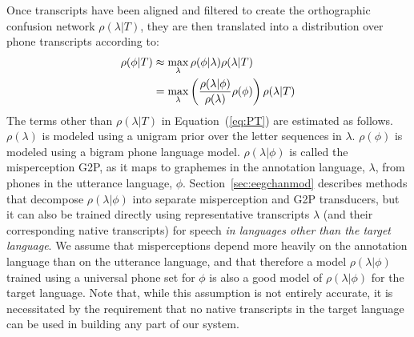 Once transcripts have
been aligned and filtered to create the orthographic confusion network
$\rho(\lambda|T)$, they are then translated into a distribution over
phone transcripts according to:
\begin{align}
  \rho(\phi|T) 
  &\approx \max_{\lambda}  \rho(\phi|\lambda) \rho(\lambda|T) \notag \\
  &= \max_{\lambda}  \left(\frac{\rho(\lambda|\phi)}{\rho(\lambda)}
  \rho(\phi)\right) \rho(\lambda|T) 
\label{eq:PT}
\end{align}
The terms other than $\rho(\lambda|T)$ in Equation~(\ref{eq:PT}) are
estimated as follows.  $\rho(\lambda)$ is modeled using a 
unigram prior over the letter sequences in $\lambda$.
$\rho(\phi)$ is modeled using a bigram phone language model.
$\rho(\lambda|\phi)$ is called the misperception G2P, as it maps to
graphemes in the annotation language, $\lambda$, from phones in the
utterance language, $\phi$.  Section~\ref{sec:eegchanmod} describes
methods that decompose $\rho(\lambda|\phi)$ into separate
misperception and G2P transducers, but it can also be trained directly
using
representative transcripts $\lambda$ (and their
corresponding native transcripts) for speech {\em in languages other
than the target language}. We assume that misperceptions depend more
heavily on the annotation language than on the utterance language, and
that therefore a model $\rho(\lambda|\phi)$ trained using a universal
phone set for $\phi$ is also a good model of $\rho(\lambda|\phi)$ for
the target language. Note that, while this assumption is not entirely
accurate, it is necessitated by the requirement that no native
transcripts in the target language can be used in building any part
of our system.


